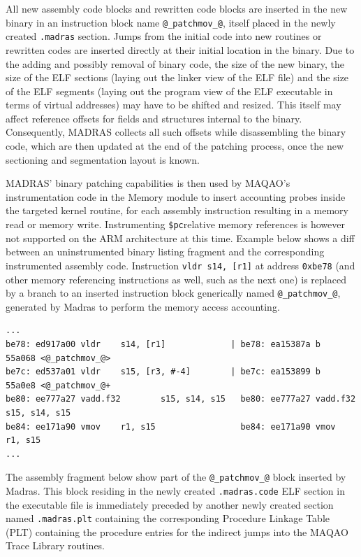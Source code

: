 \documentclass[11pt, a4paper, twoside]{montblanc2}
\begin{document}
All new assembly code blocks and rewritten code blocks are inserted in the new 
binary in an instruction block name \verb|@_patchmov_@|, itself placed in the 
newly created \verb|.madras| section. Jumps from the initial code into new 
routines or rewritten codes are inserted directly at their initial location in 
the binary. Due to the adding and possibly removal of binary code, the size of 
the new binary, the size of the ELF sections (laying out the linker view of the 
ELF file) and the size of the ELF segments (laying out the program view of the 
ELF executable in terms of virtual addresses) may have to be shifted and 
resized. This itself may affect reference offsets for fields and structures 
internal to the binary. Consequently, MADRAS collects all such offsets while 
disassembling the binary code, which are then updated at the end of the patching 
process, once the new sectioning and segmentation layout is known.

MADRAS' binary patching capabilities is then used by MAQAO's instrumentation 
code in the Memory module to insert accounting probes inside the targeted kernel 
routine, for each assembly instruction resulting in a memory read or memory 
write. Instrumenting \verb|$pc|relative memory references is however not 
supported on the ARM architecture at this time. Example below shows a diff 
between an uninstrumented binary listing fragment and the corresponding 
instrumented assembly code. Instruction \verb|vldr s14, [r1]| at address 
\texttt{0xbe78} (and other memory referencing instructions as well, such as the 
next one) is replaced by a branch to an inserted instruction block generically 
named \verb|@_patchmov_@|, generated by Madras to perform the memory access 
accounting.
\begin{footnotesize}
\begin{verbatim}
...
be78: ed917a00 vldr    s14, [r1]             | be78: ea15387a b       55a068 <@_patchmov_@>
be7c: ed537a01 vldr    s15, [r3, #-4]        | be7c: ea153899 b       55a0e8 <@_patchmov_@+
be80: ee777a27 vadd.f32        s15, s14, s15   be80: ee777a27 vadd.f32        s15, s14, s15
be84: ee171a90 vmov    r1, s15                 be84: ee171a90 vmov    r1, s15
...
\end{verbatim}
\end{footnotesize}

The assembly fragment below show part of the \verb|@_patchmov_@| block inserted 
by Madras. This block residing in the newly created \texttt{.madras.code} ELF 
section in the executable file is immediately preceded by another newly created 
section named \texttt{.madras.plt} containing the corresponding Procedure 
Linkage Table (PLT) containing the procedure entries for the indirect jumps into 
the MAQAO Trace Library routines.
\end{document}
